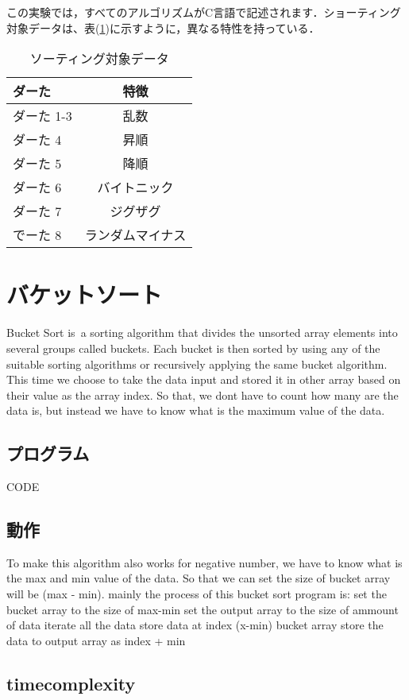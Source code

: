 \documentclass[a4j, titlepage]{jarticle}
\begin{document}
この実験では，すべてのアルゴリズムがC言語で記述されます．ショーティング対象データは、表(\ref{table_data})に示すように，異なる特性を持っている．

\begin{table}[tbh]
    \label{table_data}
    \caption{ソーティング対象データ}
    \begin{center}
        \begin{tabular}{lc}
            \hline
            ダーた & 特徴 \\ \hline\hline
            ダーた 1-3 & 乱数\\ 
            ダーた 4 &  昇順\\ 
            ダーた 5 &  降順\\ 
            ダーた 6 &  バイトニック\\ 
            ダーた 7 &  ジグザグ\\ 
            でーた 8 & ランダムマイナス\\ \hline
        \end{tabular}
    \end{center}
\end{table}

\section{バケットソート}
Bucket Sort is a sorting algorithm that divides the unsorted array elements into several groups called buckets. Each bucket is then sorted by using any of the suitable sorting algorithms or recursively applying the same bucket algorithm.
This time we choose to take the data input and stored it in other array based on their value as the array index. So that, we dont have to count how many are the data is, but instead we have to know what is the maximum value of the data. 

\subsection{プログラム}
CODE

\subsection{動作}
To make this algorithm also works for negative number, we have to know what is the max and min value of the data. So that we can set the size of bucket array will be (max - min). 
mainly the process of this bucket sort program is:
set the bucket array to the size of max-min
set the output array to the size of ammount of data
iterate all the data
store data at index (x-min) bucket array
store the data to output array as index + min

\subsection{timecomplexity}

\end{document}
